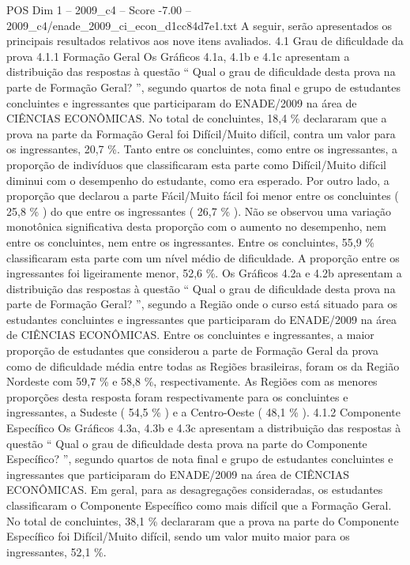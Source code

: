 \begin{textsample}{POS Dim 1 – 2009\_c4 – Score -7.00 – 2009\_c4/enade\_2009\_ci\_econ\_d1cc84d7e1.txt}
A seguir, serão apresentados os principais resultados relativos aos nove itens avaliados. 4.1 Grau de dificuldade da prova 4.1.1 Formação Geral Os Gráficos 4.1a, 4.1b e 4.1c apresentam a distribuição das respostas à questão “ Qual o grau de dificuldade desta prova na parte de Formação Geral? ”, segundo quartos de nota final e grupo de estudantes concluintes e ingressantes que participaram do ENADE/2009 na área de CIÊNCIAS ECONÔMICAS.
No total de concluintes, 18,4 \% declararam que a prova na parte da Formação Geral foi Difícil/Muito difícil, contra um valor para os ingressantes, 20,7 \%.
Tanto entre os concluintes, como entre os ingressantes, a proporção de indivíduos que classificaram esta parte como Difícil/Muito difícil diminui com o desempenho do estudante, como era esperado.
Por outro lado, a proporção que declarou a parte Fácil/Muito fácil foi menor entre os concluintes ( 25,8 \% ) do que entre os ingressantes ( 26,7 \% ).
Não se observou uma variação monotônica significativa desta proporção com o aumento no desempenho, nem entre os concluintes, nem entre os ingressantes.
Entre os concluintes, 55,9 \% classificaram esta parte com um nível médio de dificuldade.
A proporção entre os ingressantes foi ligeiramente menor, 52,6 \%.
Os Gráficos 4.2a e 4.2b apresentam a distribuição das respostas à questão “ Qual o grau de dificuldade desta prova na parte de Formação Geral? ”, segundo a Região onde o curso está situado para os estudantes concluintes e ingressantes que participaram do ENADE/2009 na área de CIÊNCIAS ECONÔMICAS.
Entre os concluintes e ingressantes, a maior proporção de estudantes que considerou a parte de Formação Geral da prova como de dificuldade média entre todas as Regiões brasileiras, foram os da Região Nordeste com 59,7 \% e 58,8 \%, respectivamente.
As Regiões com as menores proporções desta resposta foram respectivamente para os concluintes e ingressantes, a Sudeste ( 54,5 \% ) e a Centro-Oeste ( 48,1 \% ). 4.1.2 Componente Específico Os Gráficos 4.3a, 4.3b e 4.3c apresentam a distribuição das respostas à questão “ Qual o grau de dificuldade desta prova na parte do Componente Específico? ”, segundo quartos de nota final e grupo de estudantes concluintes e ingressantes que participaram do ENADE/2009 na área de CIÊNCIAS ECONÔMICAS.
Em geral, para as desagregações consideradas, os estudantes classificaram o Componente Específico como mais difícil que a Formação Geral.
No total de concluintes, 38,1 \% declararam que a prova na parte do Componente Específico foi Difícil/Muito difícil, sendo um valor muito maior para os ingressantes, 52,1 \%.

\end{textsample}
